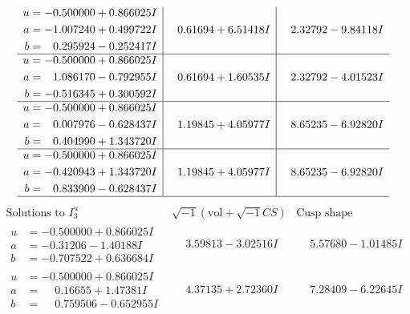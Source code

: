 \documentclass[1p]{elsarticle_modified}
\theoremstyle{definition}
\newcommand{\I}{\sqrt{-1}}
\begin{document}
$$\begin{array}{c|c|c}
\begin{aligned}
u &= -0.500000 + 0.866025 I \\
a &= -1.007240 + 0.499722 I \\
b &= \phantom{-}0.295924 - 0.252417 I\end{aligned}
 & \phantom{-}0.61694 + 6.51418 I & \phantom{-}2.32792 - 9.84118 I \\ \hline\begin{aligned}
u &= -0.500000 + 0.866025 I \\
a &= \phantom{-}1.086170 - 0.792955 I \\
b &= -0.516345 + 0.300592 I\end{aligned}
 & \phantom{-}0.61694 + 1.60535 I & \phantom{-}2.32792 - 4.01523 I \\ \hline\begin{aligned}
u &= -0.500000 + 0.866025 I \\
a &= \phantom{-}0.007976 - 0.628437 I \\
b &= \phantom{-}0.404990 + 1.343720 I\end{aligned}
 & \phantom{-}1.19845 + 4.05977 I & \phantom{-}8.65235 - 6.92820 I \\ \hline\begin{aligned}
u &= -0.500000 + 0.866025 I \\
a &= -0.420943 + 1.343720 I \\
b &= \phantom{-}0.833909 - 0.628437 I\end{aligned}
 & \phantom{-}1.19845 + 4.05977 I & \phantom{-}8.65235 - 6.92820 I\\
 \hline 
 \end{array}$$\newpage$$\begin{array}{c|c|c}  
\text{Solutions to }I^u_{3}& \I (\text{vol} + \sqrt{-1}CS) & \text{Cusp shape}\\
 \hline 
\begin{aligned}
u &= -0.500000 + 0.866025 I \\
a &= -0.31206 - 1.40188 I \\
b &= -0.707522 + 0.636684 I\end{aligned}
 & \phantom{-}3.59813 - 3.02516 I & \phantom{-}5.57680 - 1.01485 I \\ \hline\begin{aligned}
u &= -0.500000 + 0.866025 I \\
a &= \phantom{-}0.16655 + 1.47381 I \\
b &= \phantom{-}0.759506 - 0.652955 I\end{aligned}
 & \phantom{-}4.37135 + 2.72360 I & \phantom{-}7.28409 - 6.22645 I \\ \hline\begin{aligned}

\end{aligned}
\end{array}$$
\end{document}
